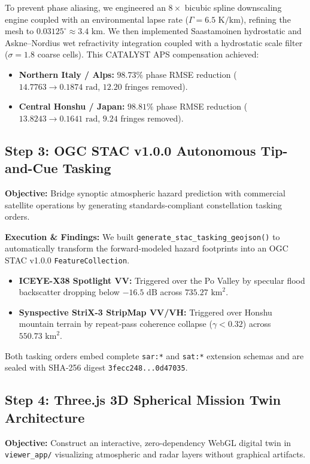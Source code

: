\documentclass[10pt,twocolumn,letterpaper]{article}
\begin{document}
To prevent phase aliasing, we engineered an $8\times$ bicubic spline downscaling engine coupled with an environmental lapse rate ($\Gamma = 6.5\text{ K/km}$), refining the mesh to $0.03125^\circ \approx 3.4\text{ km}$. We then implemented Saastamoinen hydrostatic and Askne--Nordius wet refractivity integration coupled with a hydrostatic scale filter ($\sigma = 1.8$ coarse cells). This CATALYST APS compensation achieved:
\begin{itemize}[leftmargin=*,noitemsep,topsep=1pt]
    \item \textbf{Northern Italy / Alps:} $98.73\%$ phase RMSE reduction ($14.7763 \to 0.1874\text{ rad}$, $12.20$ fringes removed).
    \item \textbf{Central Honshu / Japan:} $98.81\%$ phase RMSE reduction ($13.8243 \to 0.1641\text{ rad}$, $9.24$ fringes removed).
\end{itemize}

\subsection{Step 3: OGC STAC v1.0.0 Autonomous Tip-and-Cue Tasking}
\textbf{Objective:} Bridge synoptic atmospheric hazard prediction with commercial satellite operations by generating standards-compliant constellation tasking orders.

\textbf{Execution \& Findings:} We built \texttt{generate\_stac\_tasking\_geojson()} to automatically transform the forward-modeled hazard footprints into an OGC STAC v1.0.0 \texttt{FeatureCollection}.
\begin{itemize}[leftmargin=*,noitemsep,topsep=1pt]
    \item \textbf{ICEYE-X38 Spotlight VV:} Triggered over the Po Valley by specular flood backscatter dropping below $-16.5\text{ dB}$ across $735.27\text{ km}^2$.
    \item \textbf{Synspective StriX-3 StripMap VV/VH:} Triggered over Honshu mountain terrain by repeat-pass coherence collapse ($\gamma < 0.32$) across $550.73\text{ km}^2$.
\end{itemize}
Both tasking orders embed complete \texttt{sar:*} and \texttt{sat:*} extension schemas and are sealed with SHA-256 digest \texttt{3fecc248...0d47035}.

\subsection{Step 4: Three.js 3D Spherical Mission Twin Architecture}
\textbf{Objective:} Construct an interactive, zero-dependency WebGL digital twin in \texttt{viewer\_app/} visualizing atmospheric and radar layers without graphical artifacts.
\end{document}
